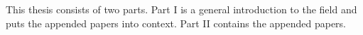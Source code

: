 \documentclass[../main.tex]{subfiles}
\begin{document}








This thesis consists of two parts. Part I is a general introduction to the field and puts the appended papers into context. Part II contains the appended papers.

\end{document}
